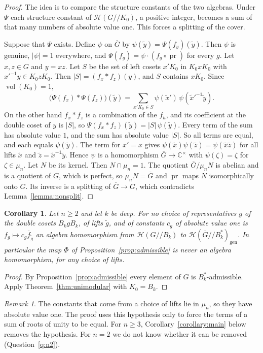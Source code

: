 \documentclass[12pt,letterpaper]{amsart}
\numberwithin{equation}{section}
\newtheorem{corollary}[theorem]{Corollary}
\theoremstyle{definition}
\theoremstyle{remark}
\newtheorem{remark}[theorem]{Remark}
\DeclareMathOperator{\vol}{vol}
\DeclareMathOperator{\pr}{pr}
\newcommand{\cH}{\mathcal{H}}
\newcommand{\C}{\mathbb{C}}
\newcommand{\Gbar}{\overline{G}}
\newcommand{\gen}{\mathrm{gen}}
\newcommand{\fbar}{\overline{f}}
\newcommand{\Hgen}{\cH(\Gbar/\!/B_k^*)_{\gen}}
\newcommand{\Hlin}{\cH(G/\!/B_k)}
\begin{document}
\begin{proof}
The idea is to compare the structure constants of the two algebras.
Under $\Psi$ each structure constant of $\cH(G/\!/K_0)$, a positive
integer, becomes a sum of that many numbers of absolute value one. This
forces a splitting of the cover.

Suppose that $\Psi$ exists. Define $\psi$ on $\Gbar$ by
$\psi(\tilde y)=\Psi(f_y)(\tilde y)$. Then $\psi$ is genuine, $|\psi|=1$
everywhere, and $\Psi(f_g)=\psi\cdot(f_g\circ\pr)$ for every $g$. Let
$x,z\in G$ and $y=xz$. Let $S$ be the set of left cosets $x'K_0$ in
$K_0xK_0$ with $x'^{-1}y\in K_0zK_0$. Then $|S|=(f_x*f_z)(y)$, and
$S$ contains $xK_0$. Since $\vol(K_0)=1$,
\[
\bigl(\Psi(f_x)*\Psi(f_z)\bigr)(\tilde y)
=\sum_{x'K_0\in S}\psi(\tilde x')\,\psi(\tilde x'^{-1}\tilde y).
\]
On the other hand $f_x*f_z$ is a combination of the $f_h$, and its
coefficient at the double coset of $y$ is $|S|$, so
$\Psi(f_x*f_z)(\tilde y)=|S|\,\psi(\tilde y)$. Every term of the sum
has absolute value $1$, and the sum has absolute value $|S|$. So all
terms are equal, and each equals $\psi(\tilde y)$. The term for
$x'=x$ gives $\psi(\tilde x)\psi(\tilde z)=\psi(\tilde x\tilde z)$ for
all lifts $\tilde x$ and $\tilde z=\tilde x^{-1}\tilde y$. Hence $\psi$
is a homomorphism $\Gbar\to\C^\times$ with $\psi(\zeta)=\zeta$ for
$\zeta\in\mu_n$. Let $N$ be its kernel. Then $N\cap\mu_n=1$. The
quotient $\Gbar/\mu_nN$ is abelian and is a quotient of $G$, which is
perfect, so $\mu_nN=\Gbar$ and $\pr$ maps $N$ isomorphically onto $G$.
Its inverse is a splitting of $\Gbar\to G$, which contradicts
Lemma~\ref{lemma:nonsplit}.
\end{proof}

\begin{corollary}
\label{cor:unimodular}
Let $n\geq 2$ and let $k$ be deep. For no choice of representatives $g$ of
the double cosets $B_kgB_k$, of lifts $\tilde g$, and of constants $c_g$
of absolute value one is $f_g\mapsto c_g\fbar_{\tilde g}$ an algebra
homomorphism from $\Hlin$ to $\Hgen$.
In particular the map $\Phi$ of Proposition~\ref{prop:admissible} is
never an algebra homomorphism, for any choice of lifts.
\end{corollary}

\begin{proof}
By Proposition~\ref{prop:admissible} every element of $G$ is
$B_k^*$-admissible. Apply Theorem~\ref{thm:unimodular} with $K_0=B_k$.
\end{proof}

\begin{remark}
The constants that come from a choice of lifts lie in $\mu_n$, so they
have absolute value one. The proof uses this hypothesis only to force
the terms of a sum of roots of unity to be equal. For $n\geq 3$,
Corollary~\ref{corollary:main} below removes the hypothesis. For $n=2$
we do not know whether it can be removed (Question~\ref{q:n2}).
\end{remark}
\end{document}
